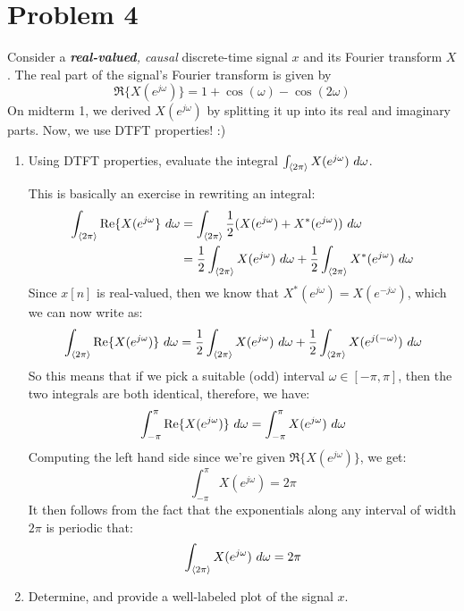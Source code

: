 \documentclass[10pt]{article}
\begin{document}
	\section*{Problem 4} 
	Consider a \textit{\textbf{real-valued}, causal} discrete-time signal \( x \) and its 
	Fourier transform \( X \). The real part of the signal's Fourier transform is given by 
	\[
	\Re \{X(e^{j \omega})\}  = 1 + \cos(\omega) - \cos(2 \omega)
	\] 
	On midterm 1, we derived \( X(e^{j \omega}) \) by splitting it up into its real and imaginary parts. Now, we use 
	DTFT properties! :)
	\begin{enumerate}[label=\alph*)]
		\item Using DTFT properties, evaluate the integral \( \int_{\langle 2\pi \rangle} X(e^{ j \omega}) \ d \omega \).

			\begin{solution}
				This is basically an exercise in rewriting an integral: 
				\begin{align*}
				\int_{\langle 2\pi \rangle} \mathrm{Re} \{X(e^{ j \omega}\} \ d \omega &= \int_{\langle 2\pi \rangle} \frac{1}{2}
				(X(e^{j \omega}) + X^{*}(e^{j \omega})) \ d  \omega\\
				&= \frac{1}{2}\int_{\langle 2\pi \rangle} X(e^{j \omega}) \ d \omega + 
				\frac{1}{2} \int_{\langle 2\pi \rangle} X^{*}(e^{j \omega}) \ d \omega
			\end{align*}
			Since \( x[n] \) is real-valued, then we know that \( X^{*}(e^{j \omega}) = X(e^{- j \omega}) \), 
			which we can now write as:
			\[
				\int_{\langle 2\pi \rangle} \mathrm{Re} \{X(e^{ j \omega})\} \ d  \omega = 
				\frac{1}{2}\int_{\langle 2\pi \rangle} X(e^{ j \omega}) \ d \omega + \frac{1}{2}
				\int_{\langle 2\pi \rangle} X(e^{j (- \omega)}) \ d  \omega
			\] 
			So this means that if we pick a suitable (odd) interval \( \omega \in [-\pi, \pi] \), then the two 
			integrals are both identical, therefore, we have:
			\[
			\int_{-\pi}^{\pi} \mathrm{Re} \{X(e^{j \omega})\} \ d \omega  = \int_{-\pi}^{\pi} X(e^{j \omega}) \ d \omega 
			\] 
			Computing the left hand side since we're given \( \Re \{X(e^{j \omega})\} \), we get:
			\[
			\int_{-\pi}^{\pi} X(e^{j \omega}) = 2\pi 
			\] 
			It then follows from the fact that the exponentials along any interval of width \( 2\pi \) is periodic 
			that:
			\[
				\int_{\langle 2\pi \rangle}X(e^{j \omega}) \ d \omega= 2\pi
			\] 
			\end{solution}
		\item Determine, and provide a well-labeled plot of the signal \( x \).


\end{enumerate}
\end{document}
